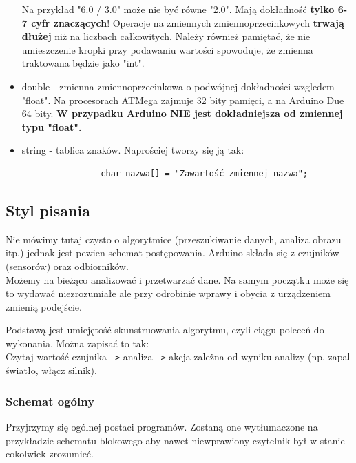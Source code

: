 \begin{itemize}
				Na przykład "6.0 / 3.0" może nie być równe "2.0". Mają dokładność \textbf{tylko 6-7 cyfr znaczących}! Operacje na zmiennych zmiennoprzecinkowych \textbf{trwają dłużej} niż na liczbach całkowitych.
				Należy również pamiętać, że nie umieszczenie kropki przy podawaniu wartości spowoduje, że zmienna traktowana będzie jako "int".
			\item double - zmienna zmiennoprzecinkowa o podwójnej dokładności wzgledem "float". Na procesorach ATMega zajmuje 32 bity pamięci, a na Arduino Due 64 bity.
				\textbf{W przypadku Arduino NIE jest dokładniejsza od zmiennej typu "float".}
			\item string - tablica znaków. Naprościej tworzy się ją tak:
				\begin{verbatim}
				char nazwa[] = "Zawartość zmiennej nazwa";
				\end{verbatim}

		\end{itemize}



	\subsection {Styl pisania}
	Nie mówimy tutaj czysto o algorytmice (przeszukiwanie danych, analiza obrazu itp.) jednak jest pewien schemat postępowania. Arduino składa się z czujników (sensorów) oraz odbiorników. %
	\\
	Możemy  na bieżąco analizować i przetwarzać dane. Na samym początku może się to wydawać niezrozumiałe ale przy odrobinie wprawy i obycia z urządzeniem zmienią podejście.
		
	Podstawą jest umiejętość skunstruowania algorytmu, czyli ciągu poleceń do wykonania. Można zapisać to tak:
	\\Czytaj wartość czujnika \verb|->| analiza \verb|->| akcja zależna od wyniku analizy (np. zapal światło, włącz silnik).
\subsubsection{Schemat ogólny}
	Przyjrzymy się ogólnej postaci programów. Zostaną one wytłumaczone na przykładzie schematu blokowego aby nawet niewprawiony czytelnik był w stanie cokolwiek zrozumieć.
